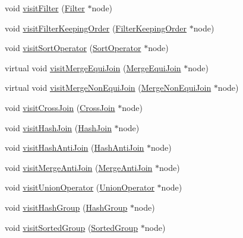 \begin{DoxyCompactItemize}
\item 
void \hyperlink{class_physical_operator_drawing_visitor_af5a712a2a8dac447846849d91d20821e}{visit\+Filter} (\hyperlink{class_filter}{Filter} $\ast$node)
\item 
void \hyperlink{class_physical_operator_drawing_visitor_a0e517a5b635ad9dd2624ca2ac5f623e6}{visit\+Filter\+Keeping\+Order} (\hyperlink{class_filter_keeping_order}{Filter\+Keeping\+Order} $\ast$node)
\item 
void \hyperlink{class_physical_operator_drawing_visitor_af0aaa68b27e6e562744b0c8211a63b9a}{visit\+Sort\+Operator} (\hyperlink{class_sort_operator}{Sort\+Operator} $\ast$node)
\item 
virtual void \hyperlink{class_physical_operator_drawing_visitor_a78f01a744a33b84011ddedca236e95e1}{visit\+Merge\+Equi\+Join} (\hyperlink{class_merge_equi_join}{Merge\+Equi\+Join} $\ast$node)
\item 
virtual void \hyperlink{class_physical_operator_drawing_visitor_acdfdd3b9f711abff9fb064495e8512e1}{visit\+Merge\+Non\+Equi\+Join} (\hyperlink{class_merge_non_equi_join}{Merge\+Non\+Equi\+Join} $\ast$node)
\item 
void \hyperlink{class_physical_operator_drawing_visitor_aaeb9fbec796677a5483384cbddd3f827}{visit\+Cross\+Join} (\hyperlink{class_cross_join}{Cross\+Join} $\ast$node)
\item 
void \hyperlink{class_physical_operator_drawing_visitor_a22032e2685059a3221b85bc990fe684e}{visit\+Hash\+Join} (\hyperlink{class_hash_join}{Hash\+Join} $\ast$node)
\item 
void \hyperlink{class_physical_operator_drawing_visitor_a1825f8934ad3c2267a40a599b13d2a1a}{visit\+Hash\+Anti\+Join} (\hyperlink{class_hash_anti_join}{Hash\+Anti\+Join} $\ast$node)
\item 
void \hyperlink{class_physical_operator_drawing_visitor_ab47caea2d0f82662947a0bf7087e0514}{visit\+Merge\+Anti\+Join} (\hyperlink{class_merge_anti_join}{Merge\+Anti\+Join} $\ast$node)
\item 
void \hyperlink{class_physical_operator_drawing_visitor_aeaa1cd49533ed1bb74921262b918bb06}{visit\+Union\+Operator} (\hyperlink{class_union_operator}{Union\+Operator} $\ast$node)
\item 
void \hyperlink{class_physical_operator_drawing_visitor_a6841170440f377c240a7c0a7af179a29}{visit\+Hash\+Group} (\hyperlink{class_hash_group}{Hash\+Group} $\ast$node)
\item 
void \hyperlink{class_physical_operator_drawing_visitor_a1c7736861639025a85d54867d7eeafca}{visit\+Sorted\+Group} (\hyperlink{class_sorted_group}{Sorted\+Group} $\ast$node)

\end{DoxyCompactItemize}
